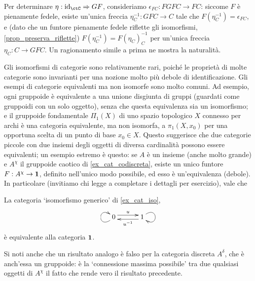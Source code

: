 \begin{remark}
\begin{itemize}
		      Per determinare \(\eta : \Id[\ctC] \nat GF\), consideriamo \(\epsilon_{FC} : FGFC \to FC\): siccome \(F\) è pienamente fedele, esiste un'unica freccia \(\eta^{-1}_C : GFC\to C\) tale che \(F(\eta^{-1}_C) = \epsilon_{FC}\), e (dato che un funtore pienamente fedele riflette gli isomorfismi, \ref{prop_preserva_riflette}) \(F(\eta^{-1}_C)=F(\eta_C)^{-1}_C\) per un'unica freccia \(\eta_C : C\to GFC\). Un ragionamento simile a prima ne mostra la naturalità.
	\end{itemize}
\end{remark}
Gli isomorfismi di categorie sono relativamente rari, poiché le proprietà di molte categorie sono invarianti per una nozione molto più debole di identificazione.
Gli esempi di categorie equivalenti ma non isomorfe sono molto comuni. Ad esempio, ogni gruppoide è equivalente a una unione disgiunta di gruppi (guardati come gruppoidi con un solo oggetto), senza che questa equivalenza sia un isomorfismo; e il gruppoide fondamentale \(\Pi_1(X)\) di uno spazio topologico \(X\) connesso per archi è una categoria equivalente, ma non isomorfa, a \(\pi_1(X,x_0)\) per una opportuna scelta di un punto di base \(x_0\in X\). Questo suggerisce che due categorie piccole con due insiemi degli oggetti di diversa cardinalità possono essere equivalenti; un esempio estremo è questo: se \(A\) è un insieme (anche molto grande) e \(A^\chi\) il gruppoide caotico di \ref{ex_cat_codiscreta}, esiste un unico funtore \(F : A^\chi \to \mathbf{1}\), definito nell'unico modo possibile, ed esso è un'equivalenza (debole). In particolare (invitiamo chi legge a completare i dettagli per esercizio), vale che
\begin{remark}
	La categoria `isomorfismo generico' di \ref{ex_cat_iso},
	\[\xymatrix@C=7ex{0 \ar@<.7ex>[r]^u \ar@(dl,ul)[] & 1 \ar@<.7ex>[l]^{u^{-1}} \ar@(ur,dr)[]}\]
	è equivalente alla categoria \(\mathbf{1}\).
\end{remark}
Si noti anche che un risultato analogo è falso per la categoria discreta \(A^\delta\), che è anch'essa un gruppoide: è la `connessione massima possibile' tra due qualsiasi oggetti di \(A^\chi\) il fatto che rende vero il risultato precedente.
